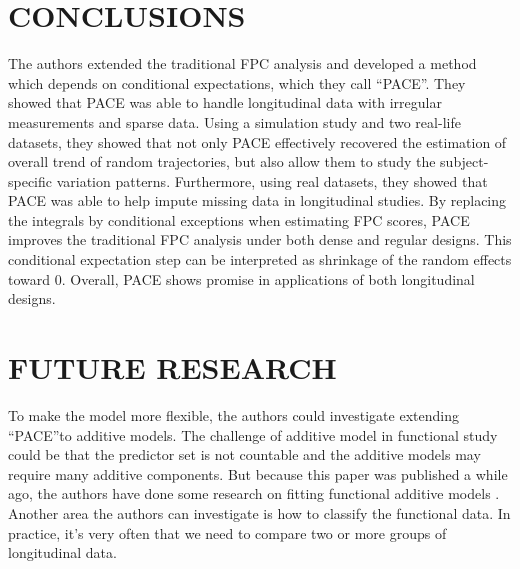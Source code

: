 \documentclass[11pt]{report}
\begin{document}
\section{CONCLUSIONS}
The authors extended the traditional FPC analysis and developed a method which depends on conditional expectations, which they call ``PACE''.
They showed that PACE was able to handle longitudinal data with irregular measurements and sparse data. 
Using a simulation study and two real-life datasets, they showed that not only PACE effectively recovered the estimation of overall trend of random trajectories, but also allow them to study the subject-specific variation patterns. 
Furthermore, using real datasets, they showed that PACE was able to help impute missing data in longitudinal studies. 
By replacing the integrals by conditional exceptions when estimating FPC scores, PACE improves the traditional FPC analysis under both dense and regular designs. 
This conditional expectation step can be interpreted as shrinkage of the random effects toward 0.  
Overall, PACE shows promise in applications of both longitudinal designs. 


\section{FUTURE RESEARCH}
To make the model more flexible, the authors could investigate extending ``PACE''to additive models. 
The challenge of additive model in functional study could be that the predictor set is not countable and the additive models may require many additive components. 
But because this paper was published a while ago, the authors have done some research on fitting functional additive models \cite{Muller2008}. 
Another area the authors can investigate is how to classify the functional data. 
In practice, it's very often that we need to compare two or more groups of longitudinal data. 




 
\end{document}

